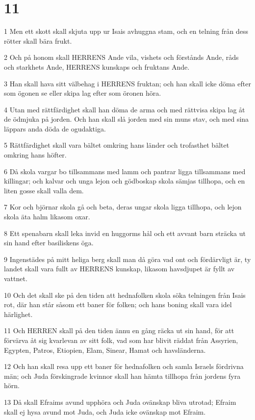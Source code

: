 \chapter{11}

\par 1 Men ett skott skall skjuta upp ur Isais avhuggna stam, och en telning från dess rötter skall bära frukt.
\par 2 Och på honom skall HERRENS Ande vila, vishets och förstånds Ande, råds och starkhets Ande, HERRENS kunskaps och fruktans Ande.
\par 3 Han skall hava sitt välbehag i HERRENS fruktan; och han skall icke döma efter som ögonen se eller skipa lag efter som öronen höra.
\par 4 Utan med rättfärdighet skall han döma de arma och med rättvisa skipa lag åt de ödmjuka på jorden. Och han skall slå jorden med sin muns stav, och med sina läppars anda döda de ogudaktiga.
\par 5 Rättfärdighet skall vara bältet omkring hans länder och trofasthet bältet omkring hans höfter.
\par 6 Då skola vargar bo tillsammans med lamm och pantrar ligga tillsammans med killingar; och kalvar och unga lejon och gödboskap skola sämjas tillhopa, och en liten gosse skall valla dem.
\par 7 Kor och björnar skola gå och beta, deras ungar skola ligga tillhopa, och lejon skola äta halm likasom oxar.
\par 8 Ett spenabarn skall leka invid en huggorms hål och ett avvant barn sträcka ut sin hand efter basiliskens öga.
\par 9 Ingenstädes på mitt heliga berg skall man då göra vad ont och fördärvligt är, ty landet skall vara fullt av HERRENS kunskap, likasom havsdjupet är fyllt av vattnet.
\par 10 Och det skall ske på den tiden att hednafolken skola söka telningen från Isais rot, där han står såsom ett baner för folken; och hans boning skall vara idel härlighet.
\par 11 Och HERREN skall på den tiden ännu en gång räcka ut sin hand, för att förvärva åt sig kvarlevan av sitt folk, vad som har blivit räddat från Assyrien, Egypten, Patros, Etiopien, Elam, Sinear, Hamat och havsländerna.
\par 12 Och han skall resa upp ett baner för hednafolken och samla Israels fördrivna män; och Juda förskingrade kvinnor skall han hämta tillhopa från jordens fyra hörn.
\par 13 Då skall Efraims avund upphöra och Juda ovänskap bliva utrotad; Efraim skall ej hysa avund mot Juda, och Juda icke ovänskap mot Efraim.
